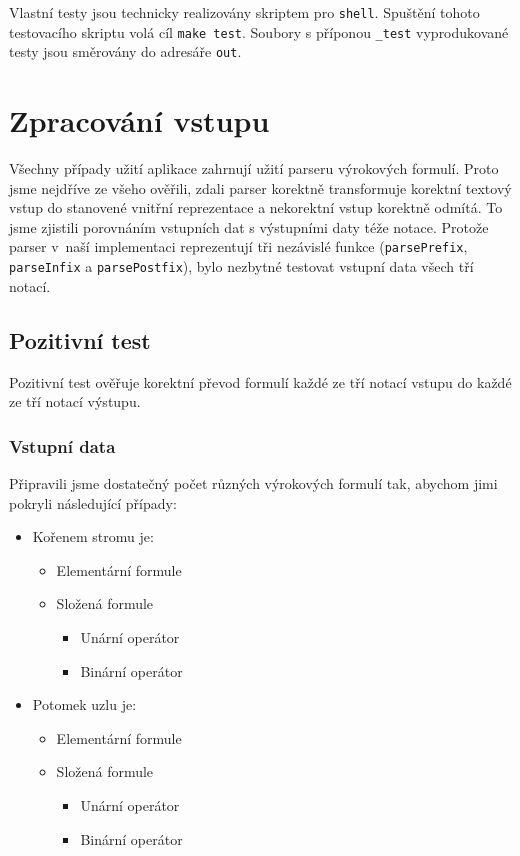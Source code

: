 \documentclass[thesis=B,czech,hidelinks]{thesis}[2012/06/26]
\begin{document}
Vlastní testy jsou technicky realizovány skriptem pro \texttt{shell}. Spuštění tohoto testovacího skriptu volá cíl \texttt{make test}. Soubory s příponou \texttt{\_test} vyprodukované testy jsou směrovány do adresáře \texttt{out}.

\section{Zpracování vstupu}

Všechny případy užití aplikace zahrnují užití parseru výrokových formulí. Proto jsme nejdříve ze všeho ověřili, zdali parser korektně transformuje korektní textový vstup do stanovené vnitřní reprezentace a nekorektní vstup korektně odmítá. To jsme zjistili porovnáním vstupních dat s výstupními daty téže notace. Protože parser v~naší implementaci reprezentují tři nezávislé funkce (\texttt{parsePrefix}, \texttt{parseInfix} a \texttt{parsePostfix}), bylo nezbytné testovat vstupní data všech tří notací. 

\subsection{Pozitivní test}

Pozitivní test ověřuje korektní převod formulí každé ze tří notací vstupu do každé ze tří notací výstupu.

\subsubsection{Vstupní data}

Připravili jsme dostatečný počet různých výrokových formulí tak, abychom jimi pokryli následující případy:

\begin{itemize}
	\item Kořenem stromu je:
	\begin{itemize}
		\item Elementární formule
		\item Složená formule
		\begin{itemize}
			\item Unární operátor
			\item Binární operátor
		\end{itemize}
	\end{itemize}
	\item Potomek uzlu je:
	\begin{itemize}
		\item Elementární formule
		\item Složená formule
		\begin{itemize}
			\item Unární operátor
			\item Binární operátor
		\end{itemize}
	\end{itemize}
\end{itemize}
\end{document}
